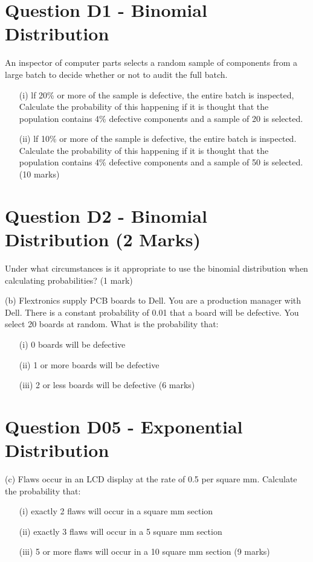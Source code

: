 \documentclass[]{report}
\begin{document}
\section{Question D1 - Binomial Distribution } %
An inspector of computer parts selects a random sample of components
from a large batch to decide whether or not to audit the full batch.

\begin{itemize}
	\item[(i)] lf 20\% or more of the sample is defective, the entire batch is
	inspected, Calculate the probability of this happening if it is
	thought that the population contains 4\% defective components and
	a sample of 20 is selected.
	\item[(ii)] lf 10\% or more of the sample is defective, the entire batch is
	inspected. Calculate the probability of this happening if it is
	thought that the population contains 4\% defective components and
	a sample of 50 is selected.
	(10 marks)
\end{itemize}


\section{Question D2 - Binomial Distribution (2 Marks) } %
Under what circumstances is it appropriate to use the binomial distribution when calculating probabilities?					(1 mark)

(b) 	Flextronics supply PCB boards to Dell.  You are a production manager with Dell.  There is a constant probability of 0.01 that a board will be defective.  You select 20 boards at random.  What is the probability that:
\begin{itemize}
	\item[(i)]	0 boards will be defective
	\item[(ii)]	1 or more boards will be defective
	\item[(iii)]	2 or less boards will be defective			
	(6 marks)
\end{itemize}

\section{Question D05 - Exponential Distribution } %
(c)	Flaws occur in an LCD display at the rate of 0.5 per square mm.  Calculate the probability that:
\begin{itemize}
	\item[(i)]	exactly 2 flaws will occur in a square mm section
	\item[(ii)]	exactly 3 flaws will occur in a 5 square mm section
	\item[(iii)]	5 or more flaws will occur in a 10 square mm section
	(9 marks)
\end{itemize}
\end{document}

